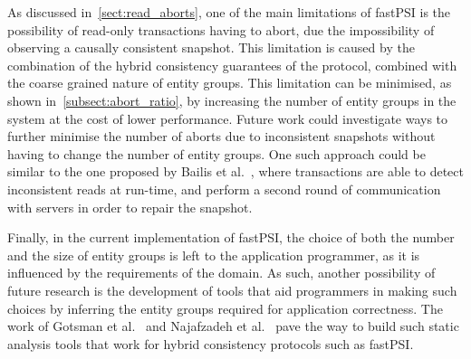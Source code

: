 As discussed in~\ref{sect:read_aborts}, one of the main limitations of fastPSI is the possibility of read-only transactions having to abort, due the impossibility of observing a causally consistent snapshot. This limitation is caused by the combination of the hybrid consistency guarantees of the protocol, combined with the coarse grained nature of entity groups. This limitation can be minimised, as shown in~\ref{subsect:abort_ratio}, by increasing the number of entity groups in the system at the cost of lower performance. Future work could investigate ways to further minimise the number of aborts due to inconsistent snapshots without having to change the number of entity groups. One such approach could be similar to the one proposed by Bailis et al.~\citep{bailis_ramp}, where transactions are able to detect inconsistent reads at run-time, and perform a second round of communication with servers in order to repair the snapshot.

Finally, in the current implementation of fastPSI, the choice of both the number and the size of entity groups is left to the application programmer, as it is influenced by the requirements of the domain. As such, another possibility of future research is the development of tools that aid programmers in making such choices by inferring the entity groups required for application correctness. The work of Gotsman et al.~\citep{gotsman_cher} and Najafzadeh et al.~\citep{cise_tool} pave the way to build such static analysis tools that work for hybrid consistency protocols such as fastPSI.
